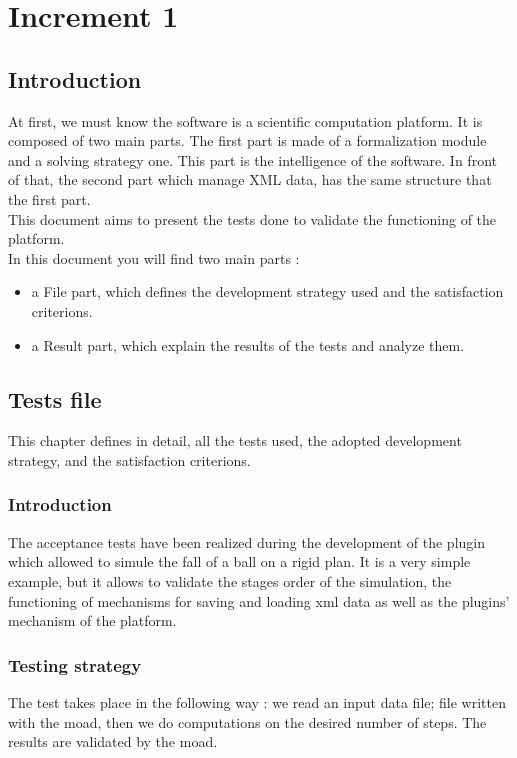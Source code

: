 \section{Increment 1}

\subsection{Introduction}
At first, we must know the software is a scientific computation platform. It is composed of two main parts. The first part is made of a
formalization module and a solving strategy one. This part is the intelligence of the software. In front of that, the second part which
manage XML data, has the same structure that the first part.\\

This document aims to present the tests done to validate the functioning of the platform.\\
In this document you will find two main parts :
\begin{itemize}
        \item a File part, which defines the development strategy used and the satisfaction criterions.
        \item a Result part, which explain the results of the tests and analyze them.
\end{itemize}


\subsection{Tests file}
This chapter defines in detail, all the tests used, the adopted development strategy, and the satisfaction criterions.

\subsubsection{Introduction}
The acceptance tests have been realized during the development of the plugin which allowed to simule the fall of a ball on a rigid plan.
It is a very simple example, but it allows to validate the stages order of the simulation, the functioning of mechanisms for saving and
loading \ac{xml} data as well as the plugins' mechanism of the platform.

\subsubsection{Testing strategy}
The test takes place in the following way : we read an input data file; file written with the \ac{moad}, then we do computations on the
desired number of steps. The results are validated by the \ac{moad}.

